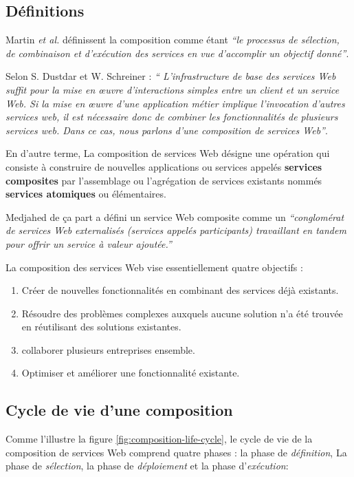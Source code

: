   \subsection{Définitions}
  \label{sec:definitions}
  Martin \emph{et al.} \cite{martin2004owl} définissent la composition
  comme étant \emph{``le processus de sélection, de combinaison et
    d'exécution des services en vue d'accomplir un objectif
    donné''}.\bigskip

  Selon S. Dustdar et W. Schreiner \cite{dustdar2005survey} : \emph{``
    L'infrastructure de base des services Web suffit pour la mise en
    œuvre d'interactions simples entre un client et un service Web. Si
    la mise en œuvre d'une application métier implique l'invocation
    d'autres services web, il est nécessaire donc de combiner les
    fonctionnalités de plusieurs services web. Dans ce cas, nous
    parlons d'une composition de services Web''}.\bigskip

  En d'autre terme, La composition de services Web désigne une
  opération qui consiste à construire de nouvelles applications ou
  services appelés \textbf{services composites} par l'assemblage ou
  l'agrégation de services existants nommés \textbf{services
    atomiques} ou élémentaires.\bigskip

  Medjahed \cite{medjahed2004thesis} de ça part a défini un service
  Web composite comme un \emph{``conglomérat de services Web
    externalisés (services appelés participants) travaillant en tandem
    pour offrir un service à valeur ajoutée.''}\bigskip

  La composition des services Web vise essentiellement quatre objectifs
  \cite{driss2011approche}:

  \begin{enumerate}
  \item Créer de nouvelles fonctionnalités en combinant des services
    déjà existants.
  \item Résoudre des problèmes complexes auxquels aucune solution n'a
    été trouvée en réutilisant des solutions existantes.
  \item collaborer plusieurs entreprises ensemble.
  \item Optimiser et améliorer une fonctionnalité existante.
  \end{enumerate}

  \subsection{Cycle de vie d'une composition }
  \label{sec:cycle-de-vie}
  Comme l'illustre la figure \ref{fig:composition-life-cycle}, le
  cycle de vie de la composition de services Web comprend quatre
  phases \cite{sheng2014web}: la phase de \textit{définition}, La
  phase de \textit{sélection}, la phase de \textit{déploiement} et la
  phase d'\textit{exécution}:

